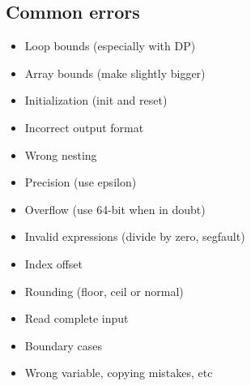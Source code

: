 \subsection{Common errors}
\begin{itemize}
\item Loop bounds (especially with DP)
\item Array bounds (make slightly bigger)
\item Initialization (init and reset)
\item Incorrect output format
\item Wrong nesting
\item Precision (use epsilon)
\item Overflow (use 64-bit when in doubt)
\item Invalid expressions (divide by zero, segfault)
\item Index offset
\item Rounding (floor, ceil or normal)
\item Read complete input
\item Boundary cases
\item Wrong variable, copying mistakes, etc
\end{itemize} 